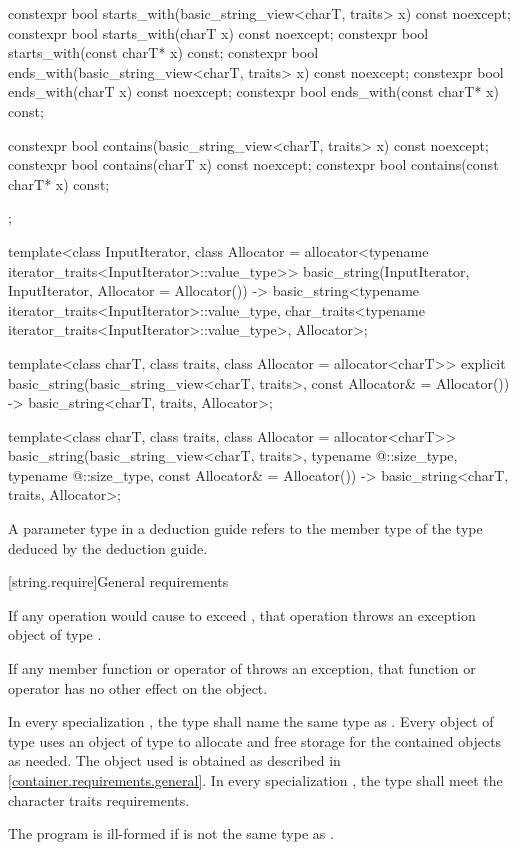 \begin{codeblock}
{{    constexpr bool starts_with(basic_string_view<charT, traits> x) const noexcept;
    constexpr bool starts_with(charT x) const noexcept;
    constexpr bool starts_with(const charT* x) const;
    constexpr bool ends_with(basic_string_view<charT, traits> x) const noexcept;
    constexpr bool ends_with(charT x) const noexcept;
    constexpr bool ends_with(const charT* x) const;

    constexpr bool contains(basic_string_view<charT, traits> x) const noexcept;
    constexpr bool contains(charT x) const noexcept;
    constexpr bool contains(const charT* x) const;
  };

  template<class InputIterator,
           class Allocator = allocator<typename iterator_traits<InputIterator>::value_type>>
    basic_string(InputIterator, InputIterator, Allocator = Allocator())
      -> basic_string<typename iterator_traits<InputIterator>::value_type,
                      char_traits<typename iterator_traits<InputIterator>::value_type>,
                      Allocator>;

  template<class charT,
           class traits,
           class Allocator = allocator<charT>>
    explicit basic_string(basic_string_view<charT, traits>, const Allocator& = Allocator())
      -> basic_string<charT, traits, Allocator>;

  template<class charT,
           class traits,
           class Allocator = allocator<charT>>
    basic_string(basic_string_view<charT, traits>,
                 typename @\seebelow@::size_type, typename @\seebelow@::size_type,
                 const Allocator& = Allocator())
      -> basic_string<charT, traits, Allocator>;
}
\end{codeblock}

\pnum
A  parameter type in
a  deduction guide
refers to the  member type of
the type deduced by the deduction guide.

[string.require]{General requirements}

\pnum
If any operation would cause  to
exceed , that operation throws an
exception object of type .

\pnum
If any member function or operator of  throws an exception, that
function or operator has no other effect on the  object.

\pnum
In every specialization ,
the type  shall name the same type
as . Every object of type
 uses an object of type
 to allocate and free storage for the contained 
objects as needed. The  object used is
obtained as described in \ref{container.requirements.general}.
In every specialization ,
the type  shall meet
the character traits requirements.
\begin{note}
The program is ill-formed if 
is not the same type as .
\end{note}

